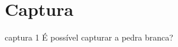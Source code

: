 \chapter{Captura}

\clearpage

\problemDiagrams
  {captura}
  {1}
  {É possível capturar a pedra branca?}





